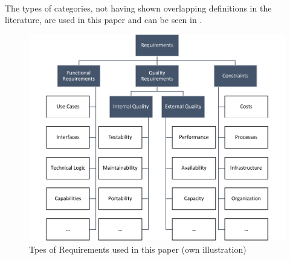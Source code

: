 \paragraph{} The types of categories, not having shown overlapping definitions in the literature, are used in this paper and can be seen in .

\begin{figure}[H]
    \centering
    \includegraphics[scale=1]{img/RequirementTypes.pdf}
    \caption[Requirement Types]{Tpes of Requirements used in this paper (own illustration)}
    \label{fig:reqTypes}
\end{figure}
